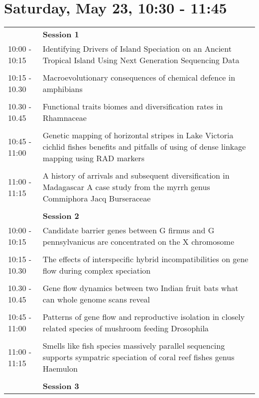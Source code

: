 \documentclass{article}
\begin{document}
\section{Saturday, May 23, 10:30 - 11:45}
\begin{longtabu} to \textwidth {lX}
 & \textbf{Session 1} \\ 

10:00 - 10:15 & Identifying Drivers of Island Speciation on an Ancient Tropical Island Using Next Generation Sequencing Data \\ 
 &  \\ 
10:15 - 10.30 & Macroevolutionary consequences of chemical defence in amphibians \\ 
 &  \\ 
10.30 - 10.45 & Functional traits  biomes  and diversification rates in Rhamnaceae \\ 
 &  \\ 
10:45 - 11:00 & Genetic mapping of horizontal stripes in Lake Victoria cichlid fishes  benefits and pitfalls of using of dense linkage mapping using RAD markers \\ 
 &  \\ 
11:00 - 11:15 & A history of arrivals and subsequent diversification in Madagascar  A case study from the myrrh genus  Commiphora Jacq  Burseraceae \\ 
 &  \\ 
 & \textbf{Session 2} \\ 

10:00 - 10:15 & Candidate barrier genes between G firmus and G pennsylvanicus are concentrated on the X chromosome \\ 
 &  \\ 
10:15 - 10.30 & The effects of interspecific hybrid incompatibilities on gene flow during complex speciation \\ 
 &  \\ 
10.30 - 10.45 & Gene flow dynamics between two Indian fruit bats  what can whole genome scans reveal \\ 
 &  \\ 
10:45 - 11:00 & Patterns of gene flow and reproductive isolation in closely related species of mushroom feeding Drosophila \\ 
 &  \\ 
11:00 - 11:15 & Smells like fish species  massively parallel sequencing supports sympatric speciation of coral reef fishes  genus  Haemulon \\ 
 &  \\ 
 & \textbf{Session 3} \\ 


\end{longtabu}
\end{document}
